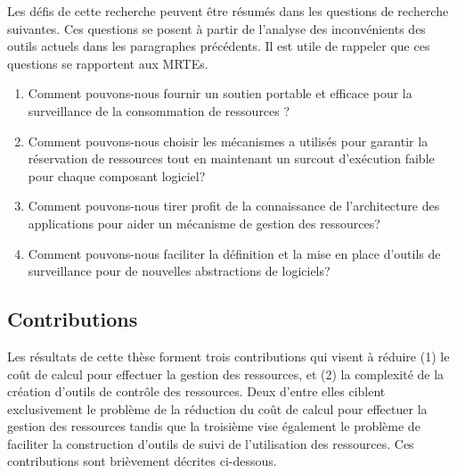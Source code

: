 Les défis de cette recherche peuvent être résumés dans les questions de recherche suivantes. Ces questions se posent à partir de l'analyse des inconvénients des outils actuels dans les paragraphes précédents. Il est utile de rappeler que ces questions se rapportent aux MRTEs.

\begin{enumerate}
\renewcommand{\theenumi}{\textit{QR\arabic{enumi}}}

\item Comment pouvons-nous fournir un soutien portable et efficace pour la surveillance de la consommation de ressources ?\label{qr:qr1}
\item Comment pouvons-nous choisir les mécanismes a utilisés pour garantir la réservation de ressources tout en maintenant un surcout d’exécution faible pour chaque composant logiciel? \label{qr:qr2}
\item Comment pouvons-nous tirer profit de la connaissance de l'architecture des applications pour aider un mécanisme de gestion des ressources? \label{qr:qr3}
\item Comment pouvons-nous faciliter la définition et la mise en place d'outils de surveillance pour de nouvelles abstractions de logiciels? \label{qr:qr4}
\end{enumerate}

\subsection*{Contributions}
Les résultats de cette thèse forment trois contributions qui visent à réduire (1) le coût de calcul pour effectuer la gestion des ressources, et (2) la complexité de la création d'outils de contrôle des ressources. Deux d'entre elles ciblent exclusivement le problème de la réduction du coût de calcul pour effectuer la gestion des ressources tandis que la troisième vise également le problème de faciliter la construction d'outils de suivi de l’utilisation des ressources. Ces contributions sont brièvement décrites ci-dessous.

